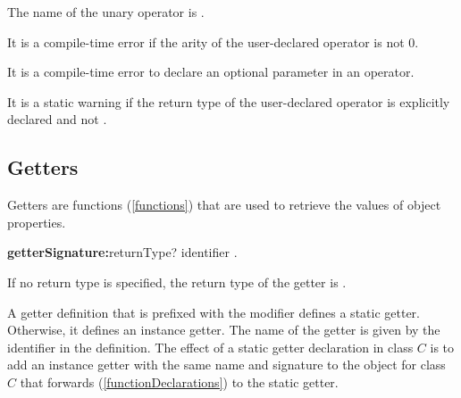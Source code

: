 \documentclass{article}
\begin{document}

\LMHash{}
The name of the unary operator \code{-} is .


\LMHash{}
It is a compile-time error if the arity of the user-declared operator \code{\~{}} is not 0.

\LMHash{}
It is a compile-time error to declare an optional parameter in an operator.

\LMHash{}
It is a static warning if the return type of the user-declared operator \code{[]=} is explicitly declared and not \VOID{}.




\subsection{Getters}

\LMHash{}
Getters are functions (\ref{functions}) that are used to retrieve the values of object properties.

\begin{grammar}
{\bf getterSignature:}returnType? \GET{} identifier
  .
\end{grammar}

\LMHash{}
If no return type is specified, the return type of the getter is \DYNAMIC{}.

\LMHash{}
A getter definition that is prefixed with the \STATIC{} modifier defines a static getter.
Otherwise, it defines an instance getter.
The name of the getter is given by the identifier in the definition.
The effect of a static getter declaration in class $C$ is to add an instance getter with the same name and signature to the  object for class $C$ that forwards (\ref{functionDeclarations}) to the static getter.
\end{document}
